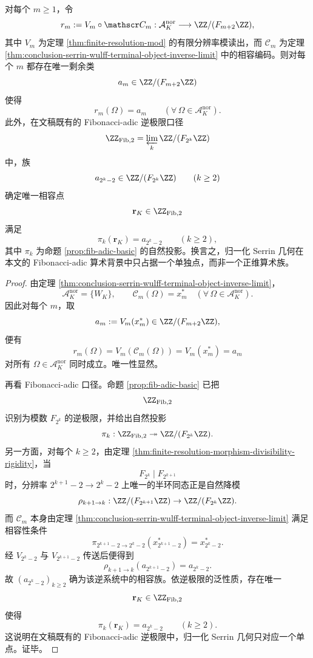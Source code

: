 \begin{theorem}\label{thm:conclusion-serrin-wulff-fibadic-single-point}
对每个 \(m\ge 1\)，令
\[
r_m:=V_m\circ \mathscr C_m:\mathcal A_K^{\mathrm{nor}}\longrightarrow \ZZ/(F_{m+2}\ZZ),
\]
其中 \(V_m\) 为定理 \ref{thm:finite-resolution-mod} 的有限分辨率模读出，而 \(\mathscr C_m\) 为定理 \ref{thm:conclusion-serrin-wulff-terminal-object-inverse-limit} 中的相容编码。则对每个 \(m\) 都存在唯一剩余类
\[
a_m\in \ZZ/(F_{m+2}\ZZ)
\]
使得
\[
r_m(\Omega)=a_m
\qquad
(\forall\,\Omega\in\mathcal A_K^{\mathrm{nor}}).
\]
此外，在文稿既有的 Fibonacci-adic 逆极限口径
\[
\ZZ_{\mathrm{Fib},2}=\varprojlim_k \ZZ/(F_{2^k}\ZZ)
\]
中，族
\[
a_{2^k-2}\in \ZZ/(F_{2^k}\ZZ)
\qquad(k\ge 2)
\]
确定唯一相容点
\[
\mathbf r_K\in \ZZ_{\mathrm{Fib},2}
\]
满足
\[
\pi_k(\mathbf r_K)=a_{2^k-2}
\qquad(k\ge 2),
\]
其中 \(\pi_k\) 为命题 \ref{prop:fib-adic-basic} 的自然投影。换言之，归一化 Serrin 几何在本文的 Fibonacci-adic 算术背景中只占据一个单独点，而非一个正维算术族。
\end{theorem}
\begin{proof}
由定理 \ref{thm:conclusion-serrin-wulff-terminal-object-inverse-limit}，
\[
\mathcal A_K^{\mathrm{nor}}=\{W_K\},
\qquad
\mathscr C_m(\Omega)=x_m^\ast
\quad
(\forall\,\Omega\in\mathcal A_K^{\mathrm{nor}}).
\]
因此对每个 \(m\)，取
\[
a_m:=V_m(x_m^\ast)\in\ZZ/(F_{m+2}\ZZ),
\]
便有
\[
r_m(\Omega)=V_m(\mathscr C_m(\Omega))=V_m(x_m^\ast)=a_m
\]
对所有 \(\Omega\in\mathcal A_K^{\mathrm{nor}}\) 同时成立。唯一性显然。

再看 Fibonacci-adic 口径。命题 \ref{prop:fib-adic-basic} 已把
\[
\ZZ_{\mathrm{Fib},2}
\]
识别为模数 \(F_{2^k}\) 的逆极限，并给出自然投影
\[
\pi_k:\ZZ_{\mathrm{Fib},2}\twoheadrightarrow \ZZ/(F_{2^k}\ZZ).
\]
另一方面，对每个 \(k\ge 2\)，由定理 \ref{thm:finite-resolution-morphism-divisibility-rigidity}，当
\[
F_{2^k}\mid F_{2^{k+1}}
\]
时，分辨率 \(2^{k+1}-2\to 2^k-2\) 上唯一的半环同态正是自然降模
\[
\rho_{k+1\to k}:\ZZ/(F_{2^{k+1}}\ZZ)\to \ZZ/(F_{2^k}\ZZ).
\]
而 \(\mathscr C_m\) 本身由定理 \ref{thm:conclusion-serrin-wulff-terminal-object-inverse-limit} 满足相容性条件
\[
\pi_{2^{k+1}-2\to 2^k-2}(x_{2^{k+1}-2}^\ast)=x_{2^k-2}^\ast.
\]
经 \(V_{2^k-2}\) 与 \(V_{2^{k+1}-2}\) 传送后便得到
\[
\rho_{k+1\to k}(a_{2^{k+1}-2})=a_{2^k-2}.
\]
故 \((a_{2^k-2})_{k\ge 2}\) 确为该逆系统中的相容族。依逆极限的泛性质，存在唯一
\[
\mathbf r_K\in \ZZ_{\mathrm{Fib},2}
\]
使得
\[
\pi_k(\mathbf r_K)=a_{2^k-2}\qquad(k\ge 2).
\]
这说明在文稿既有的 Fibonacci-adic 逆极限中，归一化 Serrin 几何只对应一个单点。证毕。
\end{proof}

\endinput
